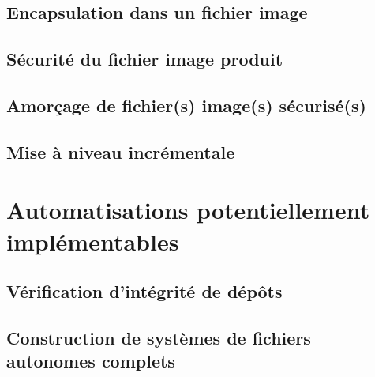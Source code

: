 \ml
{\section{\todo}}
{\section{Encapsulation dans un fichier image}}

\ml
{\section{\todo}}
{\section{Sécurité du fichier image produit}}

\ml
{\section{\todo}}
{\section{Amorçage de fichier(s) image(s) sécurisé(s)}}

\ml
{\section{\todo}}
{\section{Mise à niveau incrémentale}}

\ml
{\chapter{\todo}}
{\chapter{Automatisations potentiellement implémentables}}

\ml
{\section{\todo}}
{\section{Vérification d’intégrité de dépôts}}

\ml
{\section{\todo}}
{\section{Construction de systèmes de fichiers autonomes complets}}

